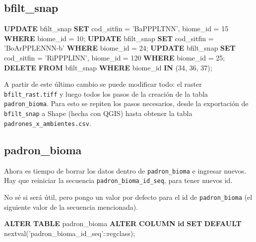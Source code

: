 \documentclass[spanish,]{article}
\newenvironment{Shaded}{}{}
\newcommand{\KeywordTok}[1]{\textcolor[rgb]{0.00,0.44,0.13}{\textbf{{#1}}}}
\newcommand{\DecValTok}[1]{\textcolor[rgb]{0.25,0.63,0.44}{{#1}}}
\newcommand{\CharTok}[1]{\textcolor[rgb]{0.25,0.44,0.63}{{#1}}}
\newcommand{\StringTok}[1]{\textcolor[rgb]{0.25,0.44,0.63}{{#1}}}
\newcommand{\NormalTok}[1]{{#1}}
\begin{document}
\subsection{bfilt\_snap}\label{bfiltux5fsnap}

\begin{Shaded}
\begin{Highlighting}[]
\KeywordTok{UPDATE} \NormalTok{bfilt_snap }\KeywordTok{SET} \NormalTok{cod_sitfin = }\StringTok{'BaPPPLTNN'}\NormalTok{, biome_id = }\DecValTok{15} \KeywordTok{WHERE} \NormalTok{biome_id = }\DecValTok{10}\NormalTok{;}
\KeywordTok{UPDATE} \NormalTok{bfilt_snap }\KeywordTok{SET} \NormalTok{cod_sitfin = }\StringTok{'BoArPPLENNN-b'} \KeywordTok{WHERE} \NormalTok{biome_id = }\DecValTok{24}\NormalTok{;}
\KeywordTok{UPDATE} \NormalTok{bfilt_snap }\KeywordTok{SET} \NormalTok{cod_sitfin = }\StringTok{'RiPPPLINN'}\NormalTok{, biome_id = }\DecValTok{120} \KeywordTok{WHERE} \NormalTok{biome_id = }\DecValTok{25}\NormalTok{;}
\KeywordTok{DELETE} \KeywordTok{FROM} \NormalTok{bfilt_snap }\KeywordTok{WHERE} \NormalTok{biome_id }\KeywordTok{IN} \NormalTok{(}\DecValTok{34}\NormalTok{, }\DecValTok{36}\NormalTok{, }\DecValTok{37}\NormalTok{);}
\end{Highlighting}
\end{Shaded}

A partir de este último cambio se puede modificar todo: el raster
\texttt{bfilt\_rast.tiff} y luego todos los pasos de la creación de la
tabla \texttt{padron\_bioma}. Para esto se repiten los pasos necesarios,
desde la exportación de \texttt{bfilt\_snap} a Shape (hecha con QGIS)
hasta obtener la tabla \texttt{padrones\_x\_ambientes.csv}.

\subsection{padron\_bioma}\label{padronux5fbioma}

Ahora es tiempo de borrar los datos dentro de \texttt{padron\_bioma} e
ingresar nuevos. Hay que reiniciar la secuencia
\texttt{padron\_bioma\_id\_seq}, para tener nuevos id.

No sé si será útil, pero pongo un valor por defecto para el id de
\texttt{padron\_bioma} (el siguiente valor de la secuencia mencionada).

\begin{Shaded}
\begin{Highlighting}[]
\KeywordTok{ALTER} \KeywordTok{TABLE} \NormalTok{padron_bioma }\KeywordTok{ALTER} \KeywordTok{COLUMN} \KeywordTok{id} \KeywordTok{SET} \KeywordTok{DEFAULT} 
  \NormalTok{nextval(}\StringTok{'padron_bioma_id_seq'}\NormalTok{:}\CharTok{:regclass}\NormalTok{);}
\end{Highlighting}
\end{Shaded}
\end{document}
